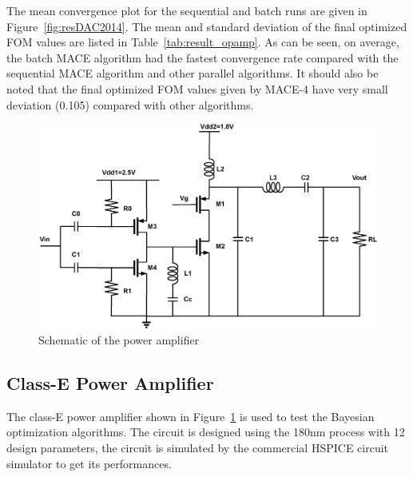 The mean convergence plot for the sequential and batch runs are given in
Figure~\ref{fig:resDAC2014}. The mean and standard deviation of the final
optimized FOM values are listed in Table~\ref{tab:result_opamp}. As can be
seen, on average, the batch MACE algorithm had the fastest convergence rate
compared with the sequential MACE algorithm and other parallel algorithms. It
should also be noted that the final optimized FOM values given by MACE-4 have
very small deviation (0.105) compared with other algorithms.



\begin{figure}[!htb]
    \begin{center}
        \centerline{\includegraphics[width=\columnwidth]{./img/classE.eps}}
        \caption{Schematic of the power amplifier}
        \label{fig:schPA}
    \end{center}
\end{figure}

\subsection{Class-E Power Amplifier}


The class-E power amplifier shown in Figure~\ref{fig:schPA} is used to test the Bayesian optimization algorithms. The
circuit is designed using the 180nm process with 12 design parameters, the
circuit is simulated by the commercial HSPICE circuit simulator to get its performances.

